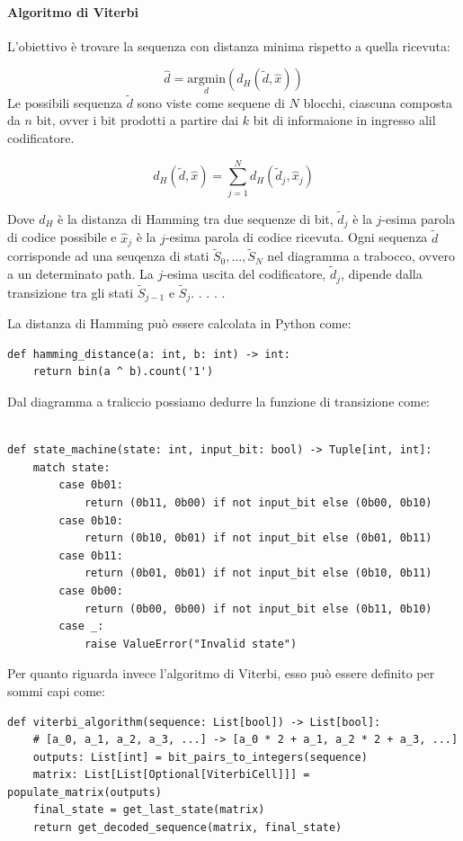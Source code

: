 \paragraph*{Algoritmo di Viterbi}
L'obiettivo è trovare la sequenza con distanza minima rispetto a quella ricevuta:

\[
    \hat{d} = \underset{d}{\text{argmin}} \left( d_H \left(\tilde{d}, \hat{x}\right) \right)
\]
Le possibili sequenza $\tilde{d}$ sono viste come sequene di $N$ blocchi, ciascuna composta da 
$n$ bit, ovver i bit prodotti a partire dai $k$ bit di informaione in ingresso alil codificatore.


\[
    d_H\left(\tilde{d}, \hat{x}\right) = \sum_{j=1}^{N} d_H\left(\tilde{d}_j, \hat{x}_j\right)
\]

Dove $d_H$ è la distanza di Hamming tra due sequenze di bit, $\tilde{d}_j$ è la $j$-esima parola  di codice possibile e $\hat{x}_j$ è la $j$-esima parola  di codice ricevuta.
Ogni sequenza $\tilde{d}$ corrisponde ad una seuqenza di stati $\tilde{S}_0, \ldots, \tilde{S}_N$ nel diagramma a trabocco, ovvero a un determinato path. La $j$-esima uscita del codificatore, $\tilde{d}_j$, dipende dalla transizione tra gli stati $\tilde{S}_{j-1}$ e $\tilde{S}_j$.
.
.
.
.

La distanza di Hamming può essere calcolata in Python come:
\begin{verbatim}
def hamming_distance(a: int, b: int) -> int:
    return bin(a ^ b).count('1')
\end{verbatim}
Dal diagramma a traliccio possiamo dedurre la funzione di transizione come:
\begin{verbatim}

def state_machine(state: int, input_bit: bool) -> Tuple[int, int]:
    match state:
        case 0b01:
            return (0b11, 0b00) if not input_bit else (0b00, 0b10)
        case 0b10:
            return (0b10, 0b01) if not input_bit else (0b01, 0b11)
        case 0b11:
            return (0b01, 0b01) if not input_bit else (0b10, 0b11)
        case 0b00:
            return (0b00, 0b00) if not input_bit else (0b11, 0b10)
        case _:
            raise ValueError("Invalid state")

\end{verbatim}
Per quanto riguarda invece l'algoritmo di Viterbi, esso può essere definito per sommi capi come:

\begin{verbatim}
def viterbi_algorithm(sequence: List[bool]) -> List[bool]:
    # [a_0, a_1, a_2, a_3, ...] -> [a_0 * 2 + a_1, a_2 * 2 + a_3, ...]
    outputs: List[int] = bit_pairs_to_integers(sequence)
    matrix: List[List[Optional[ViterbiCell]]] = populate_matrix(outputs)
    final_state = get_last_state(matrix)
    return get_decoded_sequence(matrix, final_state)
\end{verbatim}

